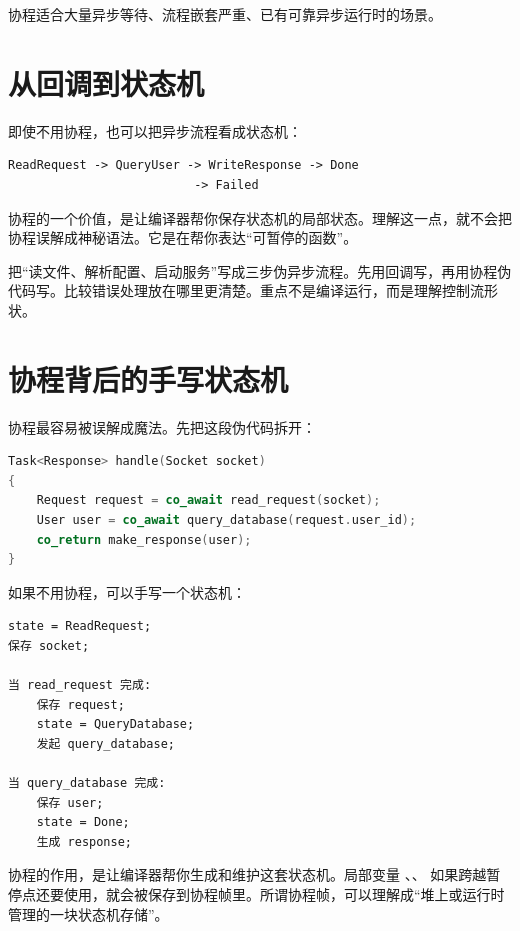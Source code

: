 协程适合大量异步等待、流程嵌套严重、已有可靠异步运行时的场景。

\section{从回调到状态机}

即使不用协程，也可以把异步流程看成状态机：

\begin{lstlisting}[caption={请求处理状态}]
ReadRequest -> QueryUser -> WriteResponse -> Done
                          -> Failed
\end{lstlisting}

协程的一个价值，是让编译器帮你保存状态机的局部状态。理解这一点，就不会把协程误解成神秘语法。它是在帮你表达“可暂停的函数”。

\begin{exercisebox}
把“读文件、解析配置、启动服务”写成三步伪异步流程。先用回调写，再用协程伪代码写。比较错误处理放在哪里更清楚。重点不是编译运行，而是理解控制流形状。
\end{exercisebox}

\section{协程背后的手写状态机}

协程最容易被误解成魔法。先把这段伪代码拆开：

\begin{lstlisting}[language=C++,caption={协程顺序写法}]
Task<Response> handle(Socket socket)
{
    Request request = co_await read_request(socket);
    User user = co_await query_database(request.user_id);
    co_return make_response(user);
}
\end{lstlisting}

如果不用协程，可以手写一个状态机：

\begin{lstlisting}[caption={手写状态机形态}]
state = ReadRequest;
保存 socket;

当 read_request 完成:
    保存 request;
    state = QueryDatabase;
    发起 query_database;

当 query_database 完成:
    保存 user;
    state = Done;
    生成 response;
\end{lstlisting}

协程的作用，是让编译器帮你生成和维护这套状态机。局部变量 、、 如果跨越暂停点还要使用，就会被保存到协程帧里。所谓协程帧，可以理解成“堆上或运行时管理的一块状态机存储”。

